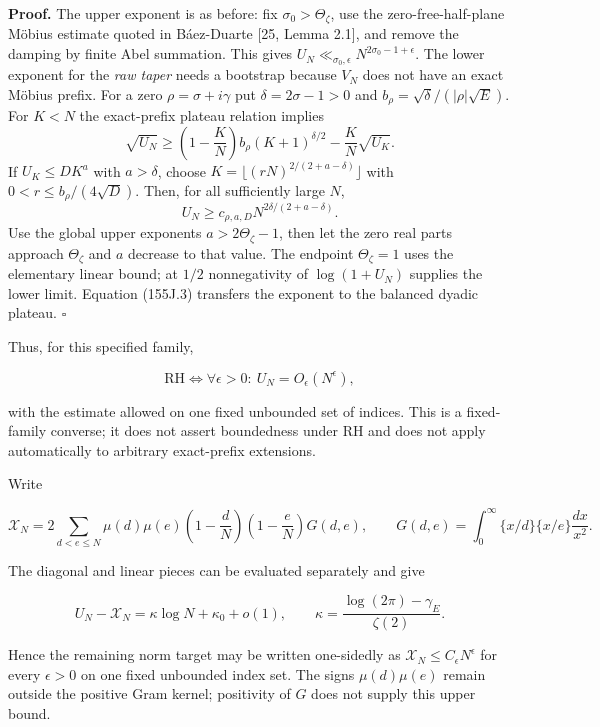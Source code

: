 \documentclass[
  11pt,
]{book}
\begin{document}
\textbf{Proof.} The upper exponent is as before: fix
\(\sigma_0>\Theta_\zeta\), use the zero-free-half-plane Möbius estimate
quoted in Báez-Duarte {[}25, Lemma 2.1{]}, and remove the damping by
finite Abel summation. This gives
\(U_N\ll_{\sigma_0,\epsilon}N^{2\sigma_0-1+\epsilon}\). The lower
exponent for the \emph{raw taper} needs a bootstrap because \(V_N\) does
not have an exact Möbius prefix. For a zero \(\rho=\sigma+i\gamma\) put
\(\delta=2\sigma-1>0\) and \(b_\rho=\sqrt{\delta}/(|\rho|\sqrt E)\). For
\(K<N\) the exact-prefix plateau relation implies \[
\sqrt{U_N}\ge\left(1-\frac KN\right)b_\rho(K+1)^{\delta/2}
-\frac KN\sqrt{U_K}.
\tag{155J.4a}
\] If \(U_K\le DK^a\) with \(a>\delta\), choose
\(K=\lfloor(rN)^{2/(2+a-\delta)}\rfloor\) with
\(0<r\le b_\rho/(4\sqrt D)\). Then, for all sufficiently large \(N\), \[
U_N\ge c_{\rho,a,D}N^{2\delta/(2+a-\delta)}.
\tag{155J.4b}
\] Use the global upper exponents \(a>2\Theta_\zeta-1\), then let the
zero real parts approach \(\Theta_\zeta\) and \(a\) decrease to that
value. The endpoint \(\Theta_\zeta=1\) uses the elementary linear bound;
at \(1/2\) nonnegativity of \(\log(1+U_N)\) supplies the lower limit.
Equation (155J.3) transfers the exponent to the balanced dyadic plateau.
\(\square\)

Thus, for this specified family,

\[
\boxed{\mathrm{RH}\iff
\forall\epsilon>0:\ U_N=O_\epsilon(N^\epsilon),}
\tag{155J.5}
\]

with the estimate allowed on one fixed unbounded set of indices. This is
a fixed-family converse; it does not assert boundedness under RH and
does not apply automatically to arbitrary exact-prefix extensions.

Write

\[
\mathcal X_N=2\sum_{d<e\le N}\mu(d)\mu(e)
\left(1-\frac dN\right)\left(1-\frac eN\right)G(d,e),
\qquad
G(d,e)=\int_0^\infty\{x/d\}\{x/e\}\frac{dx}{x^2}.
\tag{155J.6}
\]

The diagonal and linear pieces can be evaluated separately and give

\[
\boxed{U_N-\mathcal X_N=\kappa\log N+\kappa_0+o(1),
\qquad\kappa=\frac{\log(2\pi)-\gamma_E}{\zeta(2)}.}
\tag{155J.7}
\]

Hence the remaining norm target may be written one-sidedly as
\(\mathcal X_N\le C_\epsilon N^\epsilon\) for every \(\epsilon>0\) on
one fixed unbounded index set. The signs \(\mu(d)\mu(e)\) remain outside
the positive Gram kernel; positivity of \(G\) does not supply this upper
bound.
\end{document}

